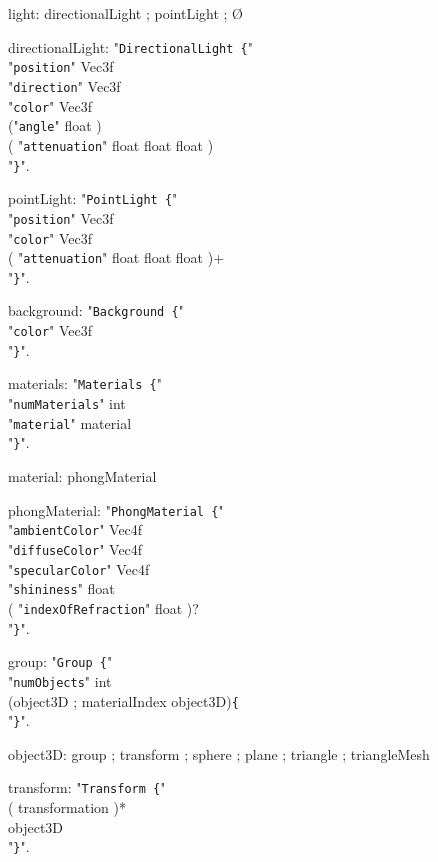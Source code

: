 \documentclass[twoside]{article}
\begin{document}
\begin{grammar}
light: directionalLight ; pointLight ; \O

directionalLight: "\verb!DirectionalLight {!"\\
    "\verb!position!" Vec3f\\
    "\verb!direction!" Vec3f\\
    "\verb!color!" Vec3f\\
    ("\verb!angle!" float )\\
    ( "\verb!attenuation!"  float float float )\\
"\verb!}!".

pointLight: "\verb!PointLight {!"\\
    "\verb!position!" Vec3f\\
    "\verb!color!" Vec3f\\
    ( "\verb!attenuation!"  float float float )+\\
"\verb!}!".

background: "\verb!Background {!"\\
    "\verb!color!" Vec3f\\
"\verb!}!".

materials: "\verb!Materials {!"\\
    "\verb!numMaterials!" int\\
    "\verb!material!" material\\
"\verb!}!".

material: phongMaterial

phongMaterial: "\verb!PhongMaterial {!"\\
    "\verb!ambientColor!" Vec4f\\
    "\verb!diffuseColor!" Vec4f\\
    "\verb!specularColor!" Vec4f\\
    "\verb!shininess!" float\\
    ( "\verb!indexOfRefraction!"  float )?\\
"\verb!}!".

group: "\verb!Group {!"\\
    "\verb!numObjects!" int\\
    (object3D ; materialIndex object3D)\verb!{!\\
"\verb!}!".

object3D: group ; transform ; sphere ; plane ; triangle ; triangleMesh

transform: "\verb!Transform {!"\\
    ( transformation )*\\
    object3D\\
"\verb!}!".


\end{grammar}
\end{document}

